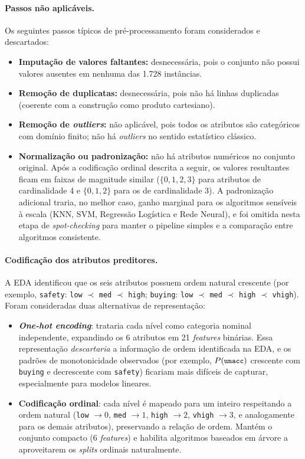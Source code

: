 \documentclass[11pt,a4paper]{article}
\newcommand{\code}[1]{\texttt{\small #1}}
\begin{document}
\paragraph{Passos não aplicáveis.}
Os seguintes passos típicos de pré-processamento foram considerados e descartados:
\begin{itemize}
\item \textbf{Imputação de valores faltantes:} desnecessária, pois o conjunto não possui valores ausentes em nenhuma das 1.728 instâncias.
\item \textbf{Remoção de duplicatas:} desnecessária, pois não há linhas duplicadas (coerente com a construção como produto cartesiano).
\item \textbf{Remoção de \textit{outliers}:} não aplicável, pois todos os atributos são categóricos com domínio finito; não há \textit{outliers} no sentido estatístico clássico.
\item \textbf{Normalização ou padronização:} não há atributos numéricos no conjunto original. Após a codificação ordinal descrita a seguir, os valores resultantes ficam em faixas de magnitude similar ($\{0,1,2,3\}$ para atributos de cardinalidade 4 e $\{0,1,2\}$ para os de cardinalidade 3). A padronização adicional traria, no melhor caso, ganho marginal para os algoritmos sensíveis à escala (KNN, SVM, Regressão Logística e Rede Neural), e foi omitida nesta etapa de \textit{spot-checking} para manter o pipeline simples e a comparação entre algoritmos consistente.
\end{itemize}

\paragraph{Codificação dos atributos preditores.}
A EDA identificou que os seis atributos possuem ordem natural crescente (por exemplo, \code{safety}: \code{low} $\prec$ \code{med} $\prec$ \code{high}; \code{buying}: \code{low} $\prec$ \code{med} $\prec$ \code{high} $\prec$ \code{vhigh}). Foram consideradas duas alternativas de representação:
\begin{itemize}
\item \textbf{\textit{One-hot encoding}}: trataria cada nível como categoria nominal independente, expandindo os 6 atributos em 21 \textit{features} binárias. Essa representação \emph{descartaria} a informação de ordem identificada na EDA, e os padrões de monotonicidade observados (por exemplo, $P(\code{unacc})$ crescente com \code{buying} e decrescente com \code{safety}) ficariam mais difíceis de capturar, especialmente para modelos lineares.
\item \textbf{Codificação ordinal}: cada nível é mapeado para um inteiro respeitando a ordem natural (\code{low} $\to 0$, \code{med} $\to 1$, \code{high} $\to 2$, \code{vhigh} $\to 3$, e analogamente para os demais atributos), preservando a relação de ordem. Mantém o conjunto compacto (6 \textit{features}) e habilita algoritmos baseados em árvore a aproveitarem os \textit{splits} ordinais naturalmente.
\end{itemize}
\end{document}
